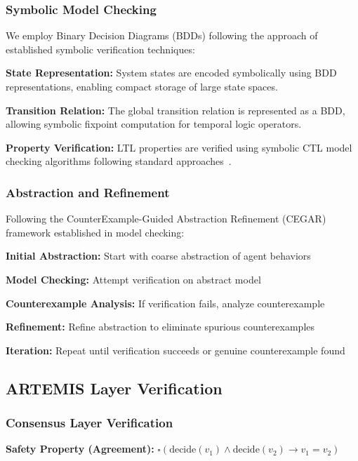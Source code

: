 \documentclass[conference]{IEEEtran}
\begin{document}
\subsubsection{Symbolic Model Checking}

We employ Binary Decision Diagrams (BDDs) following the approach of established symbolic verification techniques:

\textbf{State Representation:} System states are encoded symbolically using BDD representations, enabling compact storage of large state spaces.

\textbf{Transition Relation:} The global transition relation is represented as a BDD, allowing symbolic fixpoint computation for temporal logic operators.

\textbf{Property Verification:} LTL properties are verified using symbolic CTL model checking algorithms following standard approaches~\cite{clarke1999model}.

\subsubsection{Abstraction and Refinement}

Following the CounterExample-Guided Abstraction Refinement (CEGAR) framework established in model checking:

\textbf{Initial Abstraction:} Start with coarse abstraction of agent behaviors

\textbf{Model Checking:} Attempt verification on abstract model

\textbf{Counterexample Analysis:} If verification fails, analyze counterexample

\textbf{Refinement:} Refine abstraction to eliminate spurious counterexamples

\textbf{Iteration:} Repeat until verification succeeds or genuine counterexample found

\subsection{ARTEMIS Layer Verification}

\subsubsection{Consensus Layer Verification}

\textbf{Safety Property (Agreement):} $\square(\text{decide}(v_1) \wedge \text{decide}(v_2) \rightarrow v_1 = v_2)$
\end{document}
